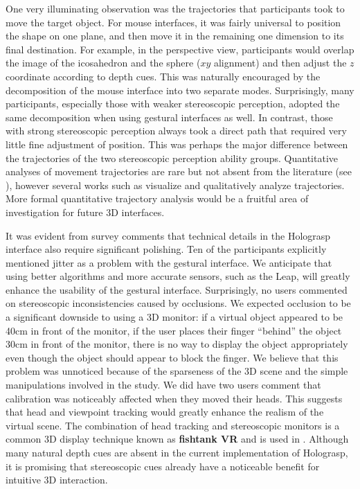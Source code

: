 \documentclass[pageno]{jpaper}
\begin{document}
One very illuminating observation was the trajectories that participants took to move the target object.
For mouse interfaces, it was fairly universal to position the shape on one plane, and then move it in the remaining one dimension 
to its final destination. For example, in the perspective view, participants would overlap the image of the icosahedron and the sphere ($xy$
alignment) and then adjust the $z$ coordinate according to depth cues. This was naturally encouraged by the decomposition of the mouse interface into two separate
modes. Surprisingly, many participants, especially those with weaker stereoscopic
perception, adopted the same decomposition when using gestural interfaces as well. In contrast, those with strong stereoscopic perception always took a direct path
that required very little fine adjustment of position. This was perhaps the major difference between the trajectories of the two stereoscopic perception ability groups. 
Quantitative analyses of movement trajectories are rare but not absent from the literature (see \cite{integralityseparability}), however
several works such as \cite{kruijff2006unconventional} visualize and qualitatively analyze trajectories. More formal quantitative trajectory analysis 
would be a fruitful area of investigation for future 3D interfaces.

It was evident from survey comments that technical details in the Holograsp interface also require significant
polishing. Ten of the participants explicitly mentioned jitter as a problem with the gestural interface. We anticipate
that using better algorithms and more accurate sensors, such as the Leap, will greatly enhance the usability of the
gestural interface. Surprisingly, no users commented on stereoscopic inconsistencies caused by occlusions. We expected
occlusion to be a significant downside to using a 3D monitor: if a virtual object appeared to be 40cm in front of the monitor, if the user
places their finger ``behind'' the object 30cm in front of the monitor, there is no way to display the object appropriately 
even though the object should appear to block the finger. We believe that this problem was unnoticed because of the sparseness of the 3D
scene and the simple manipulations involved in the study. We did have two users comment that calibration
was noticeably affected when they moved their heads. This suggests that head and viewpoint tracking would greatly enhance the 
realism of the virtual scene. The combination of head tracking and stereoscopic monitors is a common 3D display technique known as {\bf fishtank VR}
and is used in \cite{holodesk}. Although many natural depth cues are absent in the current implementation of Holograsp, it is promising that
stereoscopic cues already have a noticeable benefit for intuitive 3D interaction.
\end{document}
